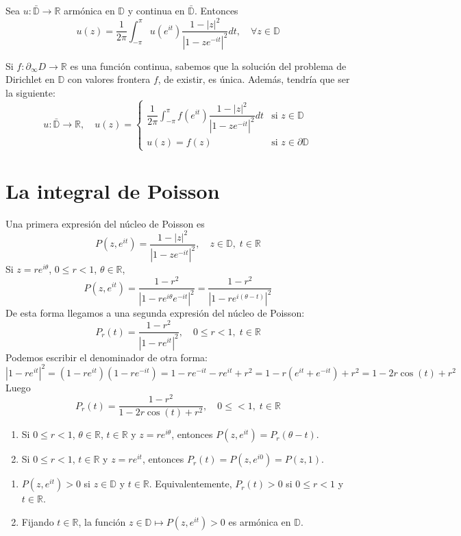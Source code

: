 \begin{theorem}
    Sea $u: \bar{\mathbb{D}} \to \mathbb{R}$ armónica en $\mathbb{D}$ y continua en $\bar{\mathbb{D}}$.
    Entonces
    $$u(z) = \frac{1}{2\pi} \int_{-\pi}^\pi u(e^{it})\frac{1-|z|^2}{|1-ze^{-it}|^2}dt, \quad \forall z \in \mathbb{D}$$
\end{theorem}

Si $f: \partial_\infty D \to \mathbb{R}$ es una función continua, sabemos que la solución del problema de Dirichlet en $\mathbb{D}$ con valores frontera $f$, de existir, es única.
Además, tendría que ser la siguiente:
$$u: \bar{\mathbb{D}} \to \mathbb{R}, \quad
    u(z) = \begin{cases}
        \dfrac{1}{2\pi} \int_{-\pi}^\pi f(e^{it})\dfrac{1-|z|^2}{|1-ze^{-it}|^2}dt & \text{si } z \in \mathbb{D}         \\
        u(z) = f(z)                                                                & \text{si } z \in \partial\mathbb{D}
    \end{cases}$$

\section{La integral de Poisson}
Una primera expresión del núcleo de Poisson es
$$P(z, e^{it}) = \frac{1-|z|^2}{|1-ze^{-it}|^2}, \quad z \in \mathbb{D}, \; t \in \mathbb{R}$$
Si $z = re^{i\theta}$, $0 \leq r < 1$, $\theta \in \mathbb{R}$,
$$P(z, e^{it}) = \frac{1-r^2}{|1-re^{i\theta}e^{-it}|^2} = \frac{1-r^2}{|1-re^{i(\theta-t)}|^2}$$
De esta forma llegamos a una segunda expresión del núcleo de Poisson:
$$P_r(t) = \frac{1-r^2}{|1-re^{it}|^2}, \quad 0 \leq r < 1, \; t \in \mathbb{R}$$
Podemos escribir el denominador de otra forma:
$$|1-re^{it}|^2 = (1-re^{it})(1-re^{-it}) = 1 - re^{-it} - re^{it} + r^2 = 1 - r(e^{it}+e^{-it}) + r^2 = 1 - 2r\cos(t) + r^2$$
Luego
$$P_r(t) = \frac{1-r^2}{1 - 2r\cos(t) + r^2}, \quad 0 \leq < 1, \; t \in \mathbb{R}$$

\begin{remark}
    \hfill
    \begin{enumerate}
        \item Si $0 \leq r < 1$, $\theta \in \mathbb{R}$, $t \in \mathbb{R}$ y $z = re^{i\theta}$, entonces $P(z, e^{it}) = P_r(\theta-t)$.
        \item Si $0 \leq r < 1$, $t \in \mathbb{R}$ y $z = re^{it}$, entonces $P_r(t) = P(z, e^{i0}) = P(z, 1)$.
    \end{enumerate}
\end{remark}

\begin{properties}
    \hfill
    \begin{enumerate}
        \item $P(z, e^{it}) > 0$ si $z \in \mathbb{D}$ y $t \in \mathbb{R}$.
              Equivalentemente, $P_r(t) > 0$ si $0 \leq r < 1$ y $t \in \mathbb{R}$.
        \item Fijando $t \in \mathbb{R}$, la función $z \in \mathbb{D} \mapsto P(z, e^{it}) > 0$ es armónica en $\mathbb{D}$.
    \end{enumerate}
\end{properties}